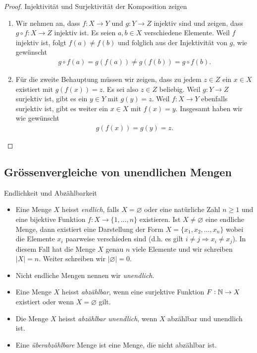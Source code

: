 \begin{proof}{Injektivität und Surjektivität der Komposition zeigen}
    \begin{enumerate}
        \item Wir nehmen an, dass $f:X\to Y$ und $g:Y\to Z$ injektiv sind und zeigen, dass $g\circ f:X\to Z$ injektiv ist. Es seien $a,b\in X$ verschiedene Elemente. Weil $f$ injektiv ist, folgt $f(a)\neq f(b)$ und folglich aus der Injektivität von $g$, wie gewünscht
            \begin{align*}
                g\circ f(a) = g(f(a))\neq g(f(b))=g\circ f(b).
            \end{align*}
        \item Für die zweite Behauptung müssen wir zeigen, dass zu jedem $z\in Z$ ein $x\in X$ existiert mit $g(f(x))= z$. Es sei also $z\in Z$ beliebig. Weil $g:Y\to Z$ surjektiv ist, gibt es ein $y\in Y$ mit $g(y)=z$. Weil $f:X\to Y$ ebenfalls surjektiv ist, gibt es weiter ein $x\in X$ mit $f(x) = y$. Insgesamt haben wir wie gewünscht
            \begin{align*}
                g(f(x))=g(y)=z.
            \end{align*}
    \end{enumerate}
\end{proof}

\subsection{Grössenvergleiche von unendlichen Mengen}

\begin{definition}{Endlichkeit und Abzählbarkeit}
    \begin{itemize}
        \item Eine Menge $X$ heisst \textit{endlich}, falls $X=\varnothing$ oder eine natürliche Zahl $n\geq 1$ und eine bijektive Funktion $f:X \to \{1,\dots,n\}$ existieren.
            Ist $X\neq\varnothing$ eine endliche Menge, dann existiert eine Darstellung der Form $X=\{x_1,x_2,\dots,x_n\}$ wobei die Elemente $x_i$ paarweise verschieden sind (d.h. es gilt $i\neq j\Rightarrow x_i\neq x_j$). In diesem Fall hat die Menge $X$ genau $n$ viele Elemente und wir schreiben $|X|=n$. Weiter schreiben wir $|\varnothing| = 0$.
        \item Nicht endliche Mengen nennen wir \textit{unendlich}.
        \item Eine Menge $X$ heisst \textit{abzählbar}, wenn eine surjektive Funktion $F:\mathbb{N}\to X$ existiert oder wenn $X=\varnothing$ gilt.
        \item Die Menge $X$ heisst \textit{abzählbar unendlich}, wenn $X$ abzählbar und unendlich ist.
        \item Eine \textit{überabzählbare} Menge ist eine Menge, die nicht abzählbar ist.
    \end{itemize}
\end{definition}

